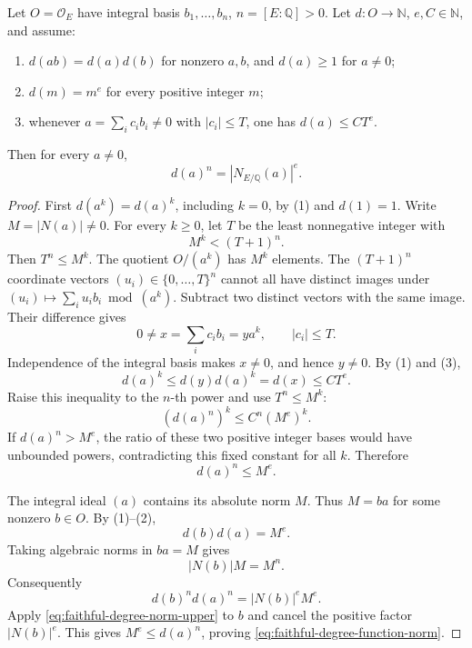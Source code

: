 \begin{srlemma}
\label{lem:faithful-degree-function-norm}
Let \(O=\mathcal O_E\) have integral basis
\(b_1,\ldots,b_n\), \(n=[E:\mathbb Q]>0\).
Let \(d:O\to\mathbb N\), \(e,C\in\mathbb N\), and assume:
\begin{enumerate}
\item \(d(ab)=d(a)d(b)\) for nonzero \(a,b\), and
\(d(a)\ge1\) for \(a\ne0\);
\item \(d(m)=m^e\) for every positive integer \(m\);
\item whenever \(a=\sum_i c_i b_i\ne0\) with
\(|c_i|\le T\), one has \(d(a)\le C T^e\).
\end{enumerate}
Then for every \(a\ne0\),
\[
                        d(a)^n=|N_{E/\mathbb Q}(a)|^e .
 \tag{NN3}\label{eq:faithful-degree-function-norm}
\]
\end{srlemma}
\begin{proof}
First \(d(a^k)=d(a)^k\), including \(k=0\), by (1) and
\(d(1)=1\).
Write \(M=|N(a)|\ne0\).
For every \(k\ge0\), let \(T\) be the least nonnegative integer
with
\[
                    M^k<(T+1)^n.
\]
Then \(T^n\le M^k\).
The quotient \(O/(a^k)\) has \(M^k\) elements.
The \((T+1)^n\) coordinate vectors
\((u_i)\in\{0,\ldots,T\}^n\) cannot all have distinct images
under \((u_i)\mapsto\sum_i u_i b_i\bmod(a^k)\).
Subtract two distinct vectors with the same image.
Their difference gives
\[
             0\ne x=\sum_i c_i b_i=y a^k,\qquad |c_i|\le T.
\]
Independence of the integral basis makes \(x\ne0\), and hence
\(y\ne0\).
By (1) and (3),
\[
                       d(a)^k\le d(y)d(a)^k=d(x)\le CT^e .
\]
Raise this inequality to the \(n\)-th power and use \(T^n\le M^k\):
\[
                  (d(a)^n)^k\le C^n(M^e)^k .
\]
If \(d(a)^n>M^e\), the ratio of these two positive integer bases
would have unbounded powers, contradicting this fixed constant
for all \(k\).  Therefore
\[
                          d(a)^n\le M^e .
 \tag{NN4}\label{eq:faithful-degree-norm-upper}
\]

The integral ideal \((a)\) contains its absolute norm \(M\).
Thus \(M=ba\) for some nonzero \(b\in O\).
By (1)--(2),
\[
                  d(b)d(a)=M^e.
\]
Taking algebraic norms in \(ba=M\) gives
\[
                    |N(b)|M=M^n.
\]
Consequently
\[
              d(b)^n d(a)^n=|N(b)|^e M^e.
\]
Apply \eqref{eq:faithful-degree-norm-upper} to \(b\) and cancel
the positive factor \(|N(b)|^e\).  This gives
\(M^e\le d(a)^n\), proving
\eqref{eq:faithful-degree-function-norm}.
\end{proof}

